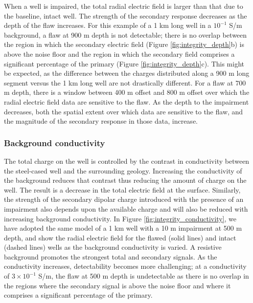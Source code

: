 \documentclass[extra,mreferee]{gji}
\begin{document}
When a well is impaired, the total radial electric field is larger than that due to the baseline, intact well. The strength of the secondary response decreases as the depth of the flaw increases. For this example of a 1 km long well in a $10^{-1}$ S/m background, a flaw at 900 m depth is not detectable; there is no overlap between the region in which the secondary electric field (Figure \ref{fig:integrity_depth}b) is above the noise floor and the region in which the secondary field comprises a significant percentage of the primary (Figure \ref{fig:integrity_depth}c). This might be expected, as the difference between the charges distributed along a 900 m long segment versus the 1 km long well are not drastically different. For a flaw at 700 m depth, there is a window between 400 m offset and 800 m offset over which the radial electric field data are sensitive to the flaw. As the depth to the impairment decreases, both the spatial extent over which data are sensitive to the flaw, and the magnitude of the secondary response in those data, increase.







\subsubsection{Background conductivity}

The total charge on the well is controlled by the contrast in conductivity between the steel-cased well and the surrounding geology. Increasing the conductivity of the background reduces that contrast thus reducing the amount of charge on the well. The result is a decrease in the total electric field at the surface. Similarly, the strength of the secondary dipolar charge introduced with the presence of an impairment also depends upon the available charge and will also be reduced with increasing background conductivity. In Figure \ref{fig:integrity_conductivity}, we have adopted the same model of a 1 km well with a 10 m impairment at 500 m depth, and show the radial electric field for the flawed (solid lines) and intact (dashed lines) wells as the background conductivity is varied. A resistive background promotes the strongest total and secondary signals. As the conductivity increases, detectability becomes more challenging; at a conductivity of $3 \times 10^{-1}$ S/m, the flaw at 500 m depth is undetectable as there is no overlap in the regions where the secondary signal is above the noise floor and where it comprises a significant percentage of the primary.
\end{document}
